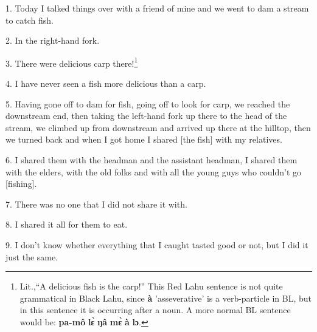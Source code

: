 \setcounter{footnote}{0}

1. Today I talked things over with a friend of mine and we went to dam a stream
to catch fish.

2. In the right-hand fork.

3. There were delicious carp there!\footnote{Lit.,``A delicious fish is the carp!'' This Red Lahu sentence is not quite grammatical in Black Lahu, since \textbf{à} 'asseverative' is a verb-particle in BL, but in this sentence it is occurring after a noun. A more normal BL sentence would be: \textbf{pa-mô} \textbf{lɛ̀} \textbf{ŋâ} \textbf{mɛ̀} \textbf{à} \textbf{lɔ}.}

4. I have never seen a fish more delicious than a carp.

5. Having gone off to dam for fish, going off to look for carp, we reached the downstream
end, then taking the left-hand fork up there to the head of the stream, we climbed
up from downstream and arrived up there at the hilltop, then we turned back and
when I got home I shared [the fish] with my relatives.

6. I shared them with the headman and the assistant headman, I shared them with
the elders, with the old folks and with all the young guys who couldn't go [fishing].

7. There was no one that I did not share it with.

8. I shared it all for them to eat.

9. I don't know whether everything that I caught tasted good or not, but I did it
just the same.

